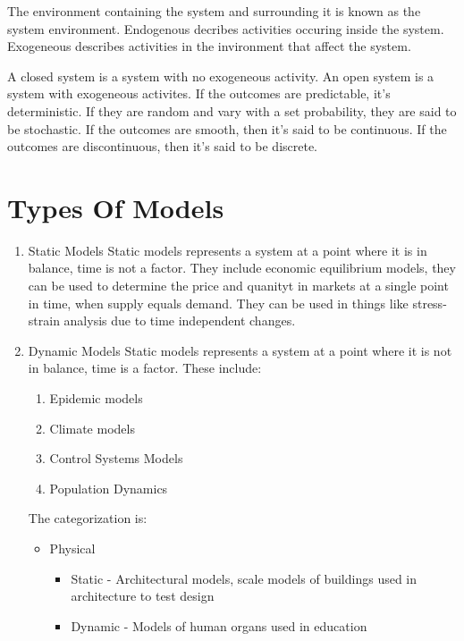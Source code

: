 \documentclass[11pt]{report}
\begin{document}
The environment containing the system and surrounding it is known as the
system environment. Endogenous decribes activities occuring inside the
system. Exogeneous describes activities in the invironment that affect
the system.

A closed system is a system with no exogeneous activity. An open system
is a system with exogeneous activites. If the outcomes are predictable,
it's deterministic. If they are random and vary with a set probability,
they are said to be stochastic. If the outcomes are smooth, then it's
said to be continuous. If the outcomes are discontinuous, then it's said
to be discrete.
\section{Types Of Models}
\label{types-of-models}
\begin{enumerate}
\item Static Models
\label{static-models}
Static models represents a system at a point where it is in balance,
time is not a factor. They include economic equilibrium models, they can
be used to determine the price and quanityt in markets at a single point
in time, when supply equals demand. They can be used in things like
stress-strain analysis due to time independent changes.
\item Dynamic Models
\label{dynamic-models}
Static models represents a system at a point where it is not in balance,
time is a factor. These include:

\begin{enumerate}
\item Epidemic models

\item Climate models

\item Control Systems Models

\item Population Dynamics
\end{enumerate}

The categorization is:

\begin{itemize}
\item Physical

\begin{itemize}
\item Static - Architectural models, scale models of buildings used in
architecture to test design

\item Dynamic - Models of human organs used in education
\end{itemize}


\end{itemize}
\end{enumerate}
\end{document}
